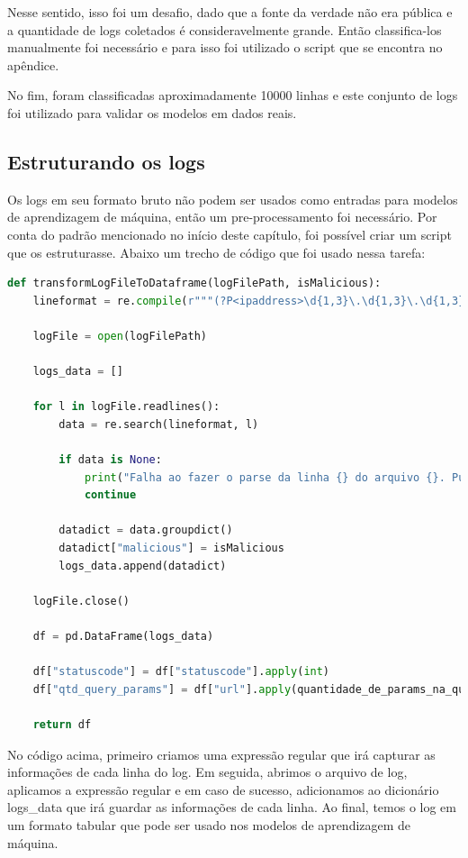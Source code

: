 Nesse sentido, isso foi um desafio, dado que a fonte da verdade não era pública e a quantidade de logs 
coletados é consideravelmente grande. Então classifica-los manualmente foi necessário e para 
isso foi utilizado o script que se encontra no apêndice.

No fim, foram classificadas aproximadamente 10000 linhas e este conjunto de logs foi utilizado para validar os modelos em dados
reais.

\subsection{Estruturando os logs}

Os logs em seu formato bruto não podem ser usados como entradas para modelos de aprendizagem
de máquina, então um pre-processamento foi necessário. Por conta do padrão mencionado no  início deste capítulo, 
foi possível criar um script que os estruturasse. Abaixo um trecho de código
que foi usado nessa tarefa:

\begin{lstlisting}[language=Python]
def transformLogFileToDataframe(logFilePath, isMalicious):
    lineformat = re.compile(r"""(?P<ipaddress>\d{1,3}\.\d{1,3}\.\d{1,3}\.\d{1,3}) - - \[(?P<dateandtime>\d{2}\/[a-z]{3}\/\d{4}:\d{2}:\d{2}:\d{2} (\+|\-)\d{4})\] ((\"(GET|POST) )(?P<url>.+)(http\/[1-2]\.[0-9]")) (?P<statuscode>\d{3}) (?P<bytessent>\d+) (?P<refferer>-|"([^"]+)") (["](?P<useragent>[^"]+)["])""", re.IGNORECASE)

    logFile = open(logFilePath)

    logs_data = []

    for l in logFile.readlines():
        data = re.search(lineformat, l)

        if data is None:
            print("Falha ao fazer o parse da linha {} do arquivo {}. Pulando..".format(l, logFile))
            continue

        datadict = data.groupdict()
        datadict["malicious"] = isMalicious
        logs_data.append(datadict)

    logFile.close()

    df = pd.DataFrame(logs_data)

    df["statuscode"] = df["statuscode"].apply(int)
    df["qtd_query_params"] = df["url"].apply(quantidade_de_params_na_query)

    return df
\end{lstlisting}

No código acima, primeiro criamos uma expressão regular que irá capturar as informações de cada linha do log. 
Em seguida, abrimos o arquivo de log, aplicamos a expressão regular e em caso de sucesso, adicionamos ao 
dicionário logs\_data que irá guardar as informações de cada linha. Ao final, temos o log em um formato tabular
que pode ser usado nos modelos de aprendizagem de máquina.